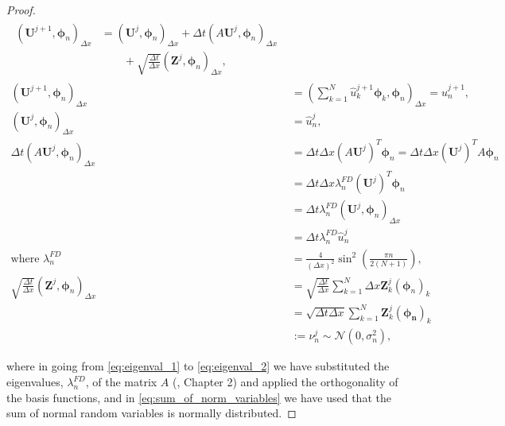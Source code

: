 \begin{proof}
\begin{align}
    \begin{split}
        (\mathbf{U}^{j+1}, \boldsymbol{\phi}_n)_{\Delta x} &= 
        (\mathbf{U}^j, \boldsymbol{\phi}_n)_{\Delta x} + 
        \Delta t (A \mathbf{U}^j, \boldsymbol{\phi}_n)_{\Delta x}
        \label{eq:inner_product_var_res}
        \\
        &\qquad + \sqrt{\frac{\Delta t}{\Delta x}} 
        (\mathbf{Z}^j, \boldsymbol{\phi}_n)_{\Delta x},
    \end{split}\\
    (\mathbf{U}^{j+1}, \boldsymbol{\phi}_n)_{\Delta x} &=
    \left(\sum_{k=1}^{N} \hat{u}_k^{j+1} \boldsymbol{\phi}_k, 
    \boldsymbol{\phi}_n\right)_{\Delta x} = 
    \hat{u}_n^{j+1}, 
    \nonumber
    \\
    (\mathbf{U}^j, \boldsymbol{\phi}_n)_{\Delta x} &= \hat{u}_n^j, 
    \nonumber
    \\
    \Delta t (A \mathbf{U}^j, \boldsymbol{\phi}_n)_{\Delta x} &= 
    \Delta t \Delta x (A \mathbf{U}^j)^T \boldsymbol{\phi}_n = 
    \Delta t \Delta x (\mathbf{U}^j)^T A \boldsymbol{\phi}_n
    \label{eq:eigenval_1}\\
    &= \Delta t \Delta x \lambda_n^{FD}(\mathbf{U}^j)^T \boldsymbol{\phi}_n 
    \nonumber
    \\
    &= \Delta t \lambda_n^{FD} (\mathbf{U}^j, \boldsymbol{\phi}_n)_{\Delta x}
    \nonumber
    \\
    &= \Delta t \lambda_n^{FD} \hat{u}_n^j
     \label{eq:eigenval_2}\\
     \text{where }\lambda_n^{FD}&= \frac{4}{(\Delta x)^2} 
     \sin^2(\frac{\pi n}{2(N+1)}),
     \nonumber
     \\
    \sqrt{\frac{\Delta t}{\Delta x}}
    (\mathbf{Z}^j, \boldsymbol{\phi}_n)_{\Delta x} &= 
    \sqrt{\frac{\Delta t}{\Delta x}} \sum_{k=1}^N
    \Delta x \mathbf{Z}_k^j(\boldsymbol{\phi}_n)_k 
    \nonumber
    \\
    &= 
    \sqrt{\Delta t \Delta x} \sum_{k=1}^N \mathbf{Z}_k^j
    (\boldsymbol{\phi_n})_k 
    \nonumber
    \\
    &:= \nu_n^j 
    \sim \mathcal{N}(0, \sigma_n^2),
    \label{eq:sum_of_norm_variables}
\end{align}

where in going from \eqref{eq:eigenval_1} to \eqref{eq:eigenval_2}
we have substituted the eigenvalues, $\lambda_n^{FD}$, of the matrix 
$A$ (\cite{strang2007computational}, Chapter 2) and applied the orthogonality
of the basis functions, and in 
\eqref{eq:sum_of_norm_variables} we have 
used that the sum of normal random variables is normally 
distributed.


\end{proof}
